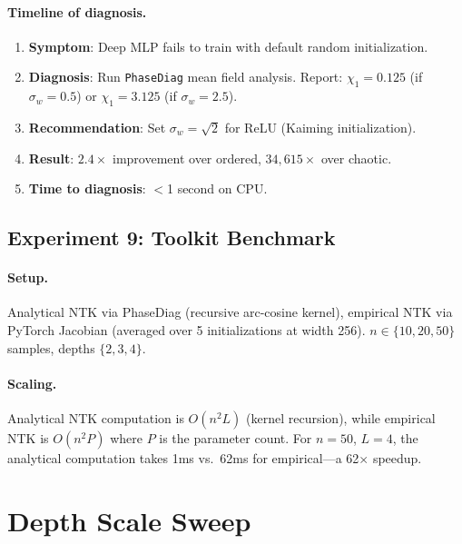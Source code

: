 \documentclass[10pt]{article}
\theoremstyle{definition}
\begin{document}
\paragraph{Timeline of diagnosis.}
\begin{enumerate}[nosep]
  \item \textbf{Symptom}: Deep MLP fails to train with default random initialization.
  \item \textbf{Diagnosis}: Run \texttt{PhaseDiag} mean field analysis. Report: $\chi_1 = 0.125$ (if $\sigma_w = 0.5$) or $\chi_1 = 3.125$ (if $\sigma_w = 2.5$).
  \item \textbf{Recommendation}: Set $\sigma_w = \sqrt{2}$ for ReLU (Kaiming initialization).
  \item \textbf{Result}: $2.4\times$ improvement over ordered, $34{,}615\times$ over chaotic.
  \item \textbf{Time to diagnosis}: $<$1 second on CPU.
\end{enumerate}

\subsection{Experiment 9: Toolkit Benchmark}

\paragraph{Setup.} Analytical NTK via PhaseDiag (recursive arc-cosine kernel), empirical NTK via PyTorch Jacobian (averaged over 5 initializations at width 256).
$n \in \{10, 20, 50\}$ samples, depths $\{2, 3, 4\}$.

\paragraph{Scaling.}
Analytical NTK computation is $O(n^2 L)$ (kernel recursion), while empirical NTK is $O(n^2 P)$ where $P$ is the parameter count.
For $n = 50$, $L = 4$, the analytical computation takes 1ms vs.\ 62ms for empirical---a 62$\times$ speedup.

\section{Depth Scale Sweep}
\label{app:depth-sweep}
\end{document}
